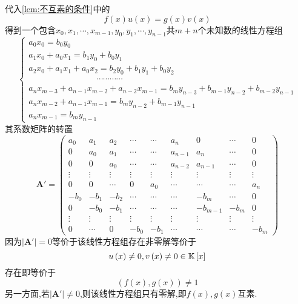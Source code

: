 代入\cref{lem:不互素的条件}中的\[f\left(x\right)u\left(x\right)=g\left(x\right)v\left(x\right)\]得到一个包含$x_0,x_1,\cdots,x_{m-1},y_0,y_1,\cdots,y_{n-1}$共$m+n$个未知数的线性方程组
\[
    \begin{cases*}
        a_0x_0=  b_0y_0                                      \\
        a_1x_0+a_0x_1=b_1y_0+b_0y_1                          \\
        a_2x_0+a_1x_1+a_0x_2=b_2y_0+b_1y_1+b_0y_2            \\
        \qquad \qquad   \qquad\qquad\cdots\cdots\cdots\cdots \\
        a_nx_{m-3}+a_{n-1}x_{m-2}+a_{n-2}x_{m-1}=
        b_m y_{n-3}+b_{m-1}y_{n-2}+b_{m-2}y_{n-1}            \\
        a_nx_{m-2}+a_{n-1}x_{m-1}=b_m y_{n-2}+b_{m-1}y_{n-1} \\
        a_nx_{m-1}=b_m y_{n-1}
    \end{cases*}
\]
其系数矩阵的转置
\[
    \bm{A}'=\begin{pmatrix}
        a_0    & a_1    & a_2    & \cdots & \cdots & a_n     & 0        & \cdots & 0      \\
        0      & a_0    & a_1    & \cdots & \cdots & a_{n-1} & a_n      & \cdots & 0      \\
        0      & 0      & a_0    & \cdots & \cdots & a_{n-2} & a_{n-1}  & \cdots & 0      \\
        \vdots & \vdots & \vdots & \vdots & \vdots & \vdots  & \vdots   & \vdots & \vdots \\
        0      & 0      & \cdots & 0      & a_0    & \cdots  & \cdots   & \cdots & a_n    \\
        -b_0   & -b_1   & -b_2   & \cdots & \cdots & \cdots  & -b_{m}   & \cdots & 0      \\
        0      & -b_0   & -b_1   & \cdots & \cdots & \cdots  & -b_{m-1} & -b_m   & 0      \\
        \vdots & \vdots & \vdots & \vdots & \vdots & \vdots  & \vdots   & \vdots & \vdots \\
        0      & \cdots & 0      & -b_0   & -b_1   & \cdots  & \cdots   & \cdots & -b_m
    \end{pmatrix}
\]
因为$\left|\bm{A}'\right|=0$等价于该线性方程组存在非零解等价于
\[u\left(x\right)\neq 0,v\left(x\right)\neq 0\in\mathbb{K} \left[x\right]\]存在即等价于\[
    \left(
    f\left(x\right),g\left(x\right)
    \right)\neq 1
\]另一方面,若$\left|\bm{A}'\right|\neq 0$,则该线性方程组只有零解,即$f\left(x\right),g\left(x\right)$互素.
